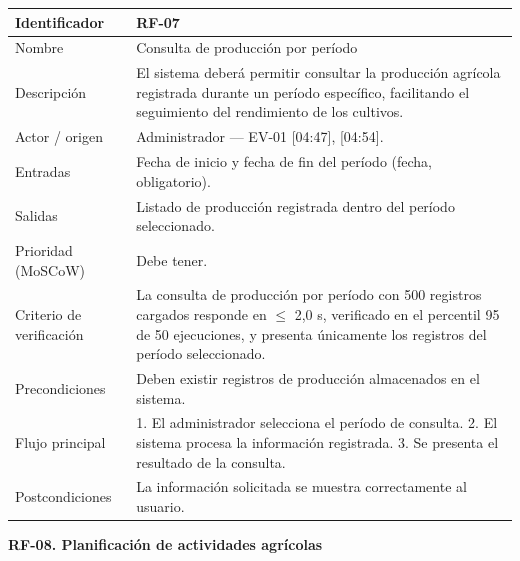 \documentclass[12pt,a4paper]{article}
\begin{document}
\begin{center}
\begin{longtable}{|p{3.5cm}|p{10.7cm}|}
\hline
Identificador & RF-07 \\
\hline
Nombre & Consulta de producción por período \\
\hline
Descripción & El sistema deberá permitir consultar la producción agrícola registrada durante un período específico, facilitando el seguimiento del rendimiento de los cultivos. \\
\hline
Actor / origen & Administrador --- EV-01 [04:47], [04:54]. \\
\hline
Entradas & Fecha de inicio y fecha de fin del período (fecha, obligatorio). \\
\hline
Salidas & Listado de producción registrada dentro del período seleccionado. \\
\hline
Prioridad (MoSCoW) & Debe tener. \\
\hline
Criterio de verificación & La consulta de producción por período con 500 registros cargados responde en $\leq$ 2,0 s, verificado en el percentil 95 de 50 ejecuciones, y presenta únicamente los registros del período seleccionado. \\
\hline
Precondiciones & Deben existir registros de producción almacenados en el sistema. \\
\hline
Flujo principal & 1. El administrador selecciona el período de consulta. 2. El sistema procesa la información registrada. 3. Se presenta el resultado de la consulta. \\
\hline
Postcondiciones & La información solicitada se muestra correctamente al usuario. \\
\hline
\end{longtable}
\end{center}

\bigskip
\noindent\textbf{RF-08. Planificación de actividades agrícolas}
\label{tab:RF-08}
\end{document}
